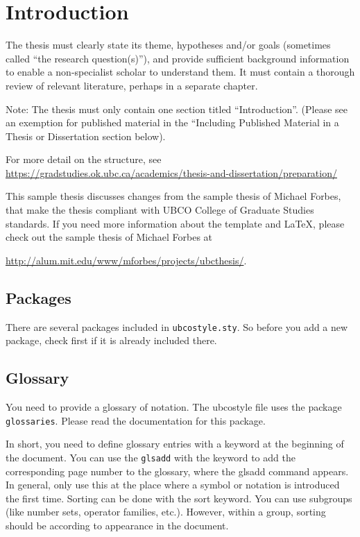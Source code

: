\documentclass[msc,oneside]{ubcthesis}%
\begin{document}
\chapter{Introduction}
The thesis must clearly state its theme, hypotheses and/or goals (sometimes called “the research question(s)”), and provide sufficient background information to enable a non-specialist scholar to understand them. It must contain a thorough review of relevant literature, perhaps in a separate chapter.

Note: The thesis must only contain one section titled “Introduction”. (Please see an exemption for published material in the “Including Published Material in a Thesis or Dissertation section below). 

For more detail on the structure, see \url{https://gradstudies.ok.ubc.ca/academics/thesis-and-dissertation/preparation/}

This sample thesis discusses changes from the sample thesis of Michael Forbes, that make the thesis compliant with UBCO College of Graduate Studies standards. If you need more information about the template and LaTeX, please check out the sample thesis of Michael Forbes at

\href{http://alum.mit.edu/www/mforbes/projects/ubcthesis/}{http://alum.mit.edu/www/mforbes/projects/ubcthesis/}.

\cite{MR2848848,MR2461448,MR2834159,infconv,convmono,MR2668638,Bauschke:2007-PA02,proxbas}

\section{Packages}
There are several packages included in \texttt{ubcostyle.sty}. So before you add a new package, check first if it is already included there.

\section{Glossary}
You need to provide a glossary of notation. The ubcostyle file uses the package \texttt{glossaries}. Please read the documentation for this package.

In short, you need to define glossary entries with a keyword at the beginning of the document. You can use the \texttt{glsadd} with the keyword to add the corresponding page number to the glossary, where the glsadd command appears. In general, only use this at the place where a symbol or notation is introduced the first time. Sorting can be done with the sort keyword. You can use subgroups (like number sets, operator families, etc.). However, within a group, sorting should be according to appearance in the document.
\end{document}
